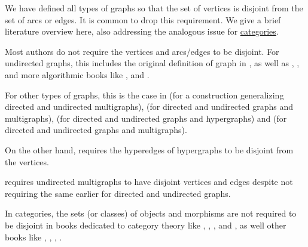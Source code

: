 \begin{remark}\label{rem:disjoint_graph_vertices_and_arcs}
  We have defined all types of graphs so that the set of vertices is disjoint from the set of arcs or edges. It is common to drop this requirement. We give a brief literature overview here, also addressing the analogous issue for \hyperref[def:category]{categories}.

  Most authors do not require the vertices and arcs/edges to be disjoint. For undirected graphs, this includes the original definition of graph in \cite[55]{König1990GraphTheory}, as well as
  \cite[9]{Harary1969GraphTheory},
  \cite[2]{Bollobás1998ModernGraphTheory},
  and more algorithmic books like
  \cite[3]{GondranMinoux1984GraphsAndAlgorithms},
  \cite[363]{Knuth1997ArtVol2} and
  \cite[190]{Erickson2019Algorithms}.

  For other types of graphs, this is the case in
  \cite[411]{Зыков2004ТеорияГрафов} (for a construction generalizing directed and undirected multigraphs),
  \cite[def. 1.1.1; def. 1.1.2]{Knauer2019AlgebraicGraphTheory} (for directed and undirected graphs and multigraphs),
  \cite[9; 16; 298]{ЕмеличевИПр1990ТеорияГрафов} (for directed and undirected graphs and hypergraphs) and
  \cite[6-7]{Мирчев2001Графи} (for directed and undirected graphs and multigraphs).

  On the other hand, \textcite[185]{DörflerWaller1980Hypergraphs} requires the hyperedges of hypergraphs to be disjoint from the vertices.

  \Textcite[28]{Diestel2017GraphTheory} requires undirected multigraphs to have disjoint vertices and edges despite not requiring the same earlier for directed and undirected graphs.

  In categories, the sets (or classes) of objects and morphisms are not required to be disjoint in books dedicated to category theory like
  \cite[10]{MacLane1998CategoryTheory},
  \cite[def. 1.1.1]{Schubert1972Categories},
  \cite[def. 1.1]{Awodey2010CategoryTheory},
  \cite[def. 1.1.1]{Perrone2024StartingCategoryTheory} and
  \cite[def. I.1.1]{ЦаленкоШульгейфер1974ОсновыТеорииКатегорий},
  as well other books like
  \cite[def. I.3.1]{Aluffi2009Algebra},
  \cite[def. 1.1]{Jacobson1989BasicAlgebraII},
  \cite[54]{Lang2002Algebra},
  \cite[def. 1.3.1]{Хелемский2014ФункциональныйАнализ}.
\end{remark}

